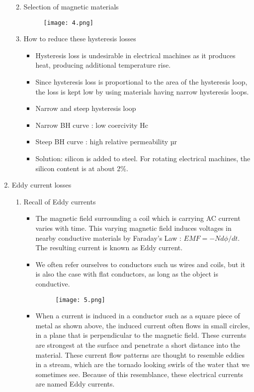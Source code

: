\begin{enumerate}
\begin{enumerate}
\begin{itemize}
        \end{itemize}
        \item Selection of magnetic materials 
        \begin{figure}[H]
            \centering
            \texttt{[image: 4.png]}
            \caption{}
        \end{figure}
        \item 	How to reduce these hysteresis losses 
        \begin{itemize}
            \item 	Hysteresis loss is undesirable in electrical machines as it produces heat, producing additional temperature rise.
            \item 	Since hysteresis loss is proportional to the area of the hysteresis loop, the loss is kept low by using materials having narrow hysteresis loops. 
            \item 	Narrow and steep hysteresis loop
            \item 	Narrow BH curve : low coercivity Hc
            \item 	Steep BH curve  : high relative permeability µr
            \item 	Solution: silicon is added to steel. For rotating electrical machines, the silicon content is at about 2\%.
        \end{itemize}
    \end{enumerate}
    \item Eddy current losses 
    \begin{enumerate}
        \item Recall of Eddy currents 
        \begin{itemize}
            \item The magnetic field surrounding a coil which is carrying AC current varies with time. This varying magnetic field induces voltages in nearby conductive materials by Faraday’s Law :  $EMF=-N d\phi/dt$. The resulting current is known as Eddy current.
            \item We often refer ourselves to conductors such us wires and coils, but it is also the case with flat conductors, as long as the object is conductive. 
            \begin{figure}[H]
                \centering
                \texttt{[image: 5.png]}
                \caption{}
            \end{figure}
            \item When a current is induced in a conductor such as a square piece of metal as shown above, the induced current often flows in small circles, in a plane that is perpendicular to the magnetic field. These currents are strongest at the surface and penetrate a short distance into the material. These current flow patterns are thought to resemble eddies in a stream, which are the tornado looking swirls of the water that we sometimes see. Because of this resemblance, these electrical currents are named Eddy currents.

\end{itemize}
\end{enumerate}
\end{enumerate}
